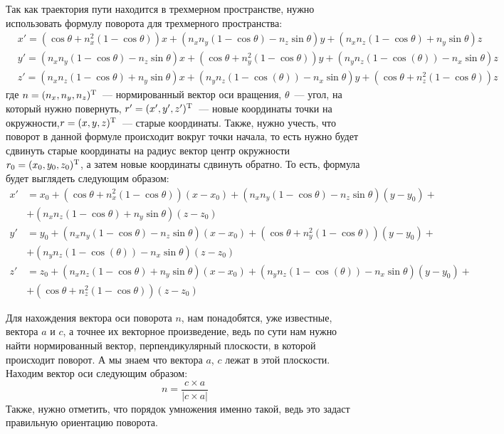 \documentclass[a4paper,12pt]{article}
\begin{document}
Так как траектория пути находится в трехмерном пространстве, нужно использовать формулу поворота для трехмерного пространства:
\begin{align*}\label{rotation_formula}
        &x' = (\cos{\theta} + n_x^2(1-\cos{\theta}))x + (n_x n_y (1-\cos{\theta}) - n_z\sin{\theta})y + (n_x n_z(1-\cos{\theta}) + n_y \sin{\theta})z \\
        &y' = (n_x n_y (1-\cos{\theta}) - n_z\sin{\theta})x + (\cos{\theta} + n_y^2(1-\cos{\theta}))y + (n_y n_z(1-\cos(\theta)) - n_x\sin{\theta})z\\
        &z' = (n_x n_z(1-\cos{\theta}) + n_y \sin{\theta})x + (n_y n_z(1-\cos(\theta)) - n_x\sin{\theta})y + (\cos{\theta} + n_z^2(1-\cos{\theta}))z
\end{align*}
где $n = (n_x,n_y,n_z)^\text{\textup{T}}$~--- нормированный вектор оси вращения, $\theta$~--- угол, на который нужно повернуть, $r' = (x',y',z')^\text{\textup{T}}$~--- новые координаты точки на окружности,$r=(x,y,z)^\text{\textup{T}}$~--- старые координаты. Также, нужно учесть, что поворот в данной формуле происходит вокруг точки начала, то есть нужно будет сдвинуть старые координаты на радиус вектор центр окружности $r_0=(x_0,y_0,z_0)^\text{\textup{T}}$, а затем новые координаты сдвинуть обратно. То есть, формула будет выглядеть следующим образом:
\begin{align*}
        x' &= x_0 + (\cos{\theta} + n_x^2(1-\cos{\theta}))(x-x_0) + (n_x n_y (1-\cos{\theta}) - n_z\sin{\theta})(y - y_0)+{} \\ 
        & + (n_x n_z(1-\cos{\theta}) + n_y \sin{\theta})(z-z_0) \\
        y' &= y_0 + (n_x n_y (1-\cos{\theta}) - n_z\sin{\theta})(x - x_0) + (\cos{\theta} + n_y^2(1-\cos{\theta}))(y - y_0)+{} \\ 
        &+ (n_y n_z(1-\cos(\theta)) - n_x\sin{\theta})(z - z_0)\\
        z' &= z_0 + (n_x n_z(1-\cos{\theta}) + n_y \sin{\theta})(x - x_0) + (n_y n_z(1-\cos(\theta)) - n_x\sin{\theta})(y-y_0) +{} \\&+ (\cos{\theta} + n_z^2(1-\cos{\theta}))(z - z_0)
\end{align*}

Для нахождения вектора оси поворота $n$, нам понадобятся, уже известные, вектора $a$ и $c$, а точнее их векторное произведение, ведь по сути нам нужно найти нормированный вектор, перпендикулярный плоскости, в которой происходит поворот. А мы знаем что вектора $a$, $c$ лежат в этой плоскости. Находим вектор оси следующим образом:
$$n=\frac{c\times a}{|c\times a|}$$
Также, нужно отметить, что порядок умножения именно такой, ведь это задаст правильную ориентацию поворота.
\end{document}
